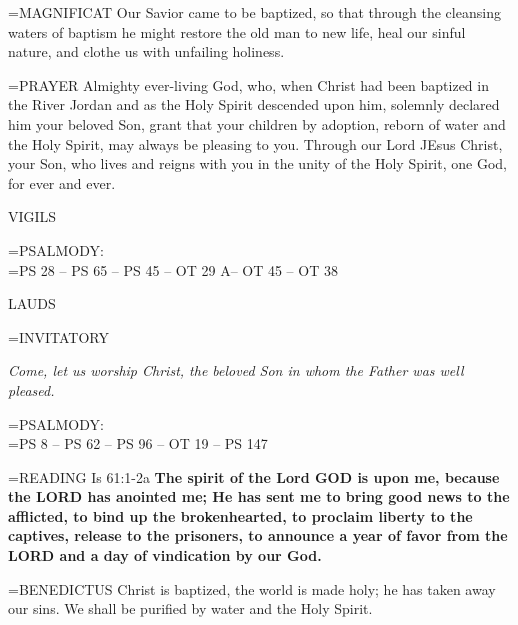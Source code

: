 \hangindent=\parindent \small{MAGNIFICAT 	Our Savior came to be baptized, so that through the cleansing waters of baptism he might restore the old man to new life, heal our sinful nature, and clothe us with unfailing holiness.\\}

\hangindent=\parindent \small{PRAYER 	Almighty ever-living God, who, when Christ had been baptized in the River Jordan and as the Holy Spirit descended upon him, solemnly declared him your beloved Son, grant that your children by adoption, reborn of water and the Holy Spirit, may always be pleasing to you. Through our Lord JEsus Christ, your Son, who lives and reigns with you in the unity of the Holy Spirit, one God, for ever and ever.}

\begin{flushleft}\normalsize VIGILS\\\end{flushleft}

\hangindent=\parindent \small{PSALMODY:}\\
\hangindent=\parindent  PS 28 -- PS 65 -- PS 45 -- OT 29 A-- OT 45 -- OT 38\vspace{0.5em}

\begin{flushleft}\normalsize LAUDS\\\end{flushleft}

\hangindent=\parindent \small{INVITATORY}
\begin{center}
\textit{Come, let us worship Christ, the beloved Son in whom the Father was well pleased.\\}
\end{center}

\hangindent=\parindent \small{PSALMODY:}\\
\hangindent=\parindent  PS 8 -- PS 62 -- PS 96 -- OT 19 -- PS 147\vspace{0.5em}

\hangindent=\parindent \small{\uppercase{READING}}   Is 61:1-2a \textbf{ The spirit of the Lord GOD is upon me, because the LORD has anointed me; He has sent me to bring good news to the afflicted, to bind up the brokenhearted, to proclaim liberty to the captives, release to the prisoners, to announce a year of favor from the LORD and a day of vindication by our God.\\}

\hangindent=\parindent \small{BENEDICTUS 	Christ is baptized, the world is made holy; he has taken away our sins. We shall be purified by water and the Holy Spirit.\\}

